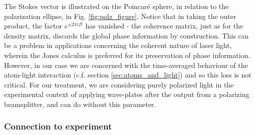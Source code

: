 	The Stokes vector is illustrated on the Poincar\'{e} sphere, in relation to the polarization ellipse, in Fig. \ref{fig:polz_figure}.
	Notice that in taking the outer product, the factor $e^{\pm2\pi i f t}$ has vanished - the coherence matrix, just as for the density matrix, discards the global phase information by construction. 
	This can be a problem in applications concerning the coherent nature of laser light, wherein the Jones calculus is preferred for its preservation of phase information.
	However, in our case we are concerned with the time-averaged behaviour of the atom-light interaction (c.f. section \ref{sec:atoms_and_light}) and so this loss is not critical.
	For our treatment, we are considering purely polarized light in the experimental context of applying wave-plates after the output from a polarizing beamsplitter, and can do without this parameter.


\subsubsection*{Connection to experiment}
	\label{ssec:connection_to_experiment}


